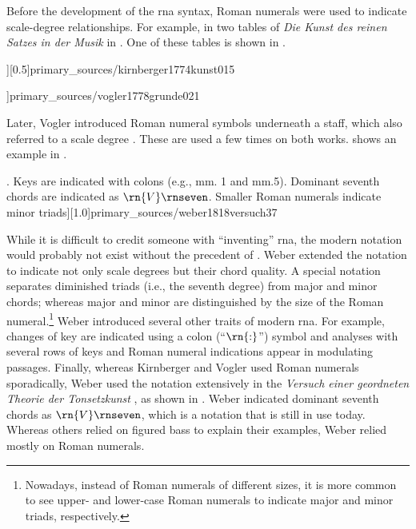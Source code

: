 
Before the development of the \gls{rna} syntax, Roman
numerals were used to indicate scale-degree relationships.
For example, in two tables of \emph{Die Kunst des reinen
Satzes in der Musik} in \textcite{kirnberger1774kunst}. One
of these tables is shown in
.

\phdfigure[Roman numerals in \textcite[p.
15]{kirnberger1774kunst}][0.5]{primary_sources/kirnberger1774kunst015}
 
\phdfigure[Roman numerals in
\textcite[Tab~XXI]{vogler1778grunde}]{primary_sources/vogler1778grunde021}

Later, Vogler introduced Roman numeral symbols underneath a
staff, which also referred to a scale degree
\parencite{vogler1778grunde, vogler1802handbuch}. These are
used a few times on both works.
 shows an
example in \textcite{vogler1778grunde}.

\phdfigure[Roman numerals in
\textcite[p.~37]{weber1818versuch}. Keys are indicated with
colons (e.g., mm. 1 and mm.5). Dominant seventh chords are
indicated as $\rn{V}\rnseven$. Smaller Roman numerals
indicate minor
triads][1.0]{primary_sources/weber1818versuch37}

While it is difficult to credit someone with ``inventing''
\gls{rna}, the modern notation would probably not exist
without the precedent of \textcite{weber1818versuch}. Weber
extended the notation to indicate not only scale degrees but
their chord quality. A special notation separates diminished
triads (i.e., the seventh degree) from major and minor
chords; whereas major and minor are distinguished by the
size of the Roman numeral.\footnote{Nowadays, instead of
Roman numerals of different sizes, it is more common to see
upper- and lower-case Roman numerals to indicate major and
minor triads, respectively.} Weber introduced several other
traits of modern \gls{rna}. For example, changes of key are
indicated using a colon (``$\rn{:}$'') symbol and analyses
with several rows of keys and Roman numeral indications
appear in modulating passages. Finally, whereas Kirnberger
and Vogler used Roman numerals sporadically, Weber used the
notation extensively in the
\emph{Versuch einer geordneten Theorie der Tonsetzkunst}
\parencite{weber1818versuch}, as shown in
. Weber indicated
dominant seventh chords as $\rn{V}\rnseven$, which is a
notation that is still in use today. Whereas others relied
on figured bass to explain their examples, Weber relied
mostly on Roman numerals.
